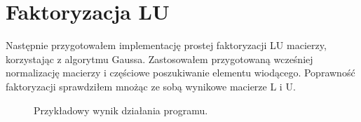 \documentclass{article}
\begin{document}
    \section{Faktoryzacja LU}
        Następnie przygotowałem implementację prostej faktoryzacji LU macierzy, korzystając z algorytmu Gaussa. Zastosowałem przygotowaną wcześniej normalizację macierzy i częściowe poszukiwanie elementu wiodącego. Poprawność faktoryzacji sprawdziłem mnożąc ze sobą wynikowe macierze L i U. 
        \begin{figure}[h!]
            \centering
            \caption{Przykładowy wynik działania programu.}
        \end{figure}\\
\end{document}

